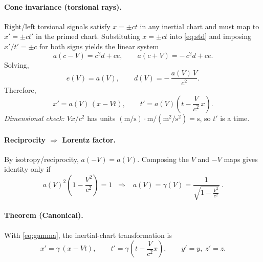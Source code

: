 \documentclass[10pt,reprint,aps,onecolumn,nofootinbib]{revtex4-2}
\begin{document}
        \paragraph{Cone invariance (torsional rays).}
            Right/left torsional signals satisfy $x=\pm ct$ in any inertial chart and must map to $x'=\pm c t'$ in the primed chart. Substituting $x=\pm ct$ into \eqref{eq:std} and imposing $x'/t'=\pm c$ for both signs yields the linear system
            \begin{equation}
                a(c - V) = c^{2} d + c e,\qquad a(c + V) = -\,c^{2} d + c e.
            \end{equation}
            Solving,
            \begin{equation}
                e(V)=a(V), \qquad d(V)=-\,\frac{a(V)\,V}{c^{2}}. \label{eq:de}
            \end{equation}
            Therefore,
            \begin{equation}
                \boxed{~x' = a(V)\,(x - Vt), \qquad t' = a(V)\!\left(t - \frac{V}{c^{2}}\,x\right).~} \label{eq:preLorentz}
            \end{equation}
            \emph{Dimensional check:} $Vx/c^2$ has units $(\mathrm{m/s})\cdot \mathrm{m}/(\mathrm{m^2/s^2})=\mathrm{s}$, so $t'$ is a time.

        \paragraph{Reciprocity $\Rightarrow$ Lorentz factor.}
            By isotropy/reciprocity, $a(-V)=a(V)$. Composing the $V$ and $-V$ maps gives identity only if
            \begin{equation}
                a(V)^2\!\left(1 - \frac{V^2}{c^2}\right)=1
                \;\;\Rightarrow\;\;
                \boxed{~a(V)=\gamma(V)=\frac{1}{\sqrt{1-\tfrac{V^2}{c^2}}}~}. \label{eq:gamma}
            \end{equation}

        \paragraph{Theorem (Canonical).}
            With \eqref{eq:gamma}, the inertial-chart transformation is
            \begin{equation}
                \boxed{~x'=\gamma\,(x - Vt),\qquad t'=\gamma\!\left(t - \frac{V}{c^{2}}x\right),\qquad y'=y,\; z'=z.~} \label{eq:Lorentz}
            \end{equation}
\end{document}
